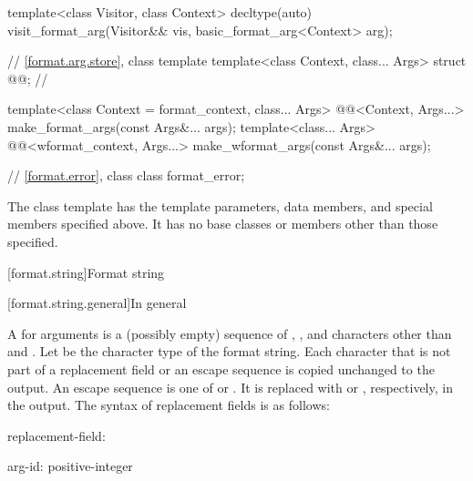 \begin{codeblock}
{  template<class Visitor, class Context>
    decltype(auto) visit_format_arg(Visitor&& vis, basic_format_arg<Context> arg);

  // \ref{format.arg.store}, class template 
  template<class Context, class... Args> struct @@;      // \expos

  template<class Context = format_context, class... Args>
    @@<Context, Args...>
      make_format_args(const Args&... args);
  template<class... Args>
    @@<wformat_context, Args...>
      make_wformat_args(const Args&... args);

  // \ref{format.error}, class 
  class format_error;
}
\end{codeblock}


\pnum
The class template 
has the template parameters, data members, and special members specified above. It has no base classes or members other than those specified.

[format.string]{Format string}

[format.string.general]{In general}

\newcommand{\fmtnontermdef}[1]{{\BnfNontermshape#1\itcorr}\textnormal{:}}
\newcommand{\fmtgrammarterm}[1]{\gterm{#1}}

\pnum
A  for arguments  is
a (possibly empty) sequence of
,
,
and characters other than \tcode{\{} and \tcode{\}}.
Let  be the character type of the format string.
Each character that is not part of
a replacement field or an escape sequence
is copied unchanged to the output.
An escape sequence is one of \tcode{\{\{} or \tcode{\}\}}.
It is replaced with \tcode{\{} or \tcode{\}}, respectively, in the output.
The syntax of replacement fields is as follows:

\begin{ncbnf}
\fmtnontermdef{replacement-field}\br
    \terminal{\{}   \terminal{\}}
\end{ncbnf}

\begin{ncbnf}
\fmtnontermdef{arg-id}\br
    \br
    positive-integer
\end{ncbnf}

